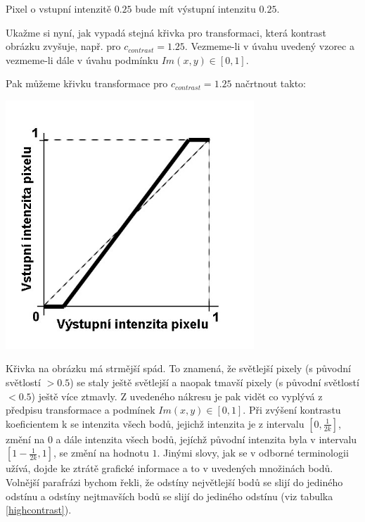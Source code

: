 Pixel o vstupní intenzitě $0.25$ bude mít výstupní intenzitu $0.25$.

Ukažme si nyní, jak vypadá stejná křivka pro transformaci, která kontrast obrázku zvyšuje, např. pro $ c_{contrast}=1.25 $.
Vezmeme-li v úvahu uvedený vzorec a vezmeme-li dále v úvahu podmínku $ Im(x,y) \in [0,1] $.

Pak můžeme křivku transformace pro $ c_{contrast}=1.25 $ načrtnout takto:


\begin{center}
\includegraphics[width=0.7\textwidth,height=0.7\textwidth]{Text/IMG/Kontrast_Transformace_1.jpg}
\end{center}

Křivka na obrázku má strmější spád. To znamená, že světlejší pixely (s původní světlostí $> 0.5$) se staly ještě světlejší a naopak tmavší pixely (s původní světlostí $< 0.5$) ještě více ztmavly. Z uvedeného nákresu je pak vidět co vyplývá z předpisu transformace a podmínek $ Im(x,y) \in [0,1]$. Při zvýšení kontrastu koeficientem k se intenzita všech bodů, jejichž intenzita je z intervalu $ [0,\frac{1}{2k}] $, změní na $0$ a dále intenzita všech bodů, jejíchž původní intenzita byla v intervalu $[1-\frac{1}{2k},1]$, se změní na hodnotu $1$. Jinými slovy, jak se v odborné terminologii užívá, dojde ke ztrátě grafické informace a to v uvedených množinách bodů. Volnější parafrázi bychom řekli, že odstíny největlejší bodů se slijí do jediného odstínu a odstíny nejtmavších bodů se slijí do jediného odstínu (viz tabulka \ref{highcontrast}).

